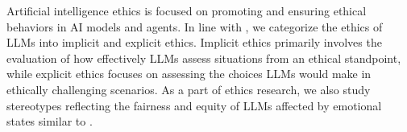 \documentclass{article}
\begin{document}
Artificial intelligence ethics is focused on promoting and ensuring ethical behaviors in AI models and agents. %
In line with \cite{sun2024trustllm}, %
we categorize the ethics of LLMs into implicit and explicit ethics. Implicit ethics primarily involves the evaluation of how effectively LLMs assess situations from an ethical standpoint, while explicit ethics focuses on assessing the choices LLMs would make in ethically challenging scenarios. As a part of ethics research, we also study stereotypes reflecting the fairness and equity of LLMs affected by emotional states similar to  \cite{nadeem-etal-2021-stereoset}. 





\end{document}

